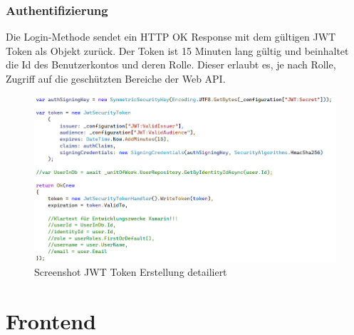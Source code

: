 \newpage
\subsubsection{Authentifizierung}
\author{Stefano Pyringer}
Die Login-Methode sendet ein HTTP OK Response mit dem gültigen JWT Token als Objekt zurück. 
Der Token ist 15 Minuten lang gültig und beinhaltet die Id des Benutzerkontos und deren Rolle. 
Dieser erlaubt es, je nach Rolle, Zugriff auf die geschützten Bereiche der Web API.

\begin{figure}[!h]
    \includegraphics*[width=15cm]{./pics/screenshot_jwt_create.png}
    \caption[JWT create]{Screenshot JWT Token Erstellung detailiert}
\end{figure}

\newpage
\section{Frontend}
\author{Mirzet Sakonjic}
